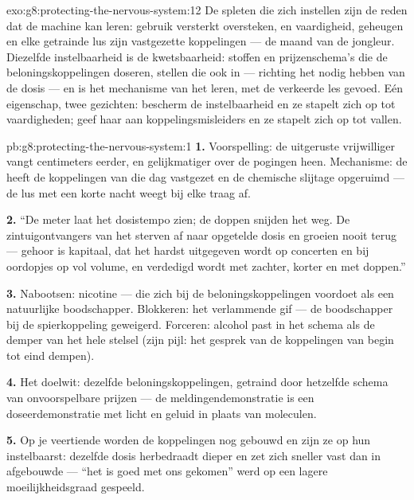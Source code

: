\begin{solution}{exo:g8:protecting-the-nervous-system:12}
De spleten die zich instellen zijn de reden dat de machine kan leren:
gebruik versterkt oversteken, en vaardigheid, geheugen en elke getrainde
lus zijn vastgezette koppelingen --- de maand van de jongleur. Diezelfde
instelbaarheid is de kwetsbaarheid: stoffen en prijzenschema's die de
beloningskoppelingen doseren, stellen die ook in --- richting het nodig
hebben van de dosis --- en  is het mechanisme van het leren, met
de verkeerde les gevoed. Eén eigenschap, twee gezichten: bescherm de
instelbaarheid en ze stapelt zich op tot vaardigheden; geef haar aan
koppelingsmisleiders en ze stapelt zich op tot vallen.
\end{solution}

\begin{solution}{pb:g8:protecting-the-nervous-system:1}
\textbf{1.} Voorspelling: de uitgeruste vrijwilliger vangt centimeters
eerder, en gelijkmatiger over de pogingen heen. Mechanisme: de  heeft
de koppelingen van die dag vastgezet en de chemische slijtage opgeruimd ---
de lus met een korte nacht weegt bij elke  traag af.

\textbf{2.} ``De meter laat het dosistempo zien; de doppen snijden het weg.
De zintuigontvangers van het  sterven af naar opgetelde dosis en groeien
nooit terug --- gehoor is kapitaal, dat het hardst uitgegeven wordt op
concerten en bij oordopjes op vol volume, en verdedigd wordt met zachter,
korter en met doppen.''

\textbf{3.} Nabootsen: nicotine --- die zich bij de beloningskoppelingen
voordoet als een natuurlijke boodschapper. Blokkeren: het verlammende gif
--- de boodschapper bij de spierkoppeling geweigerd. Forceren: alcohol
past in het schema als de demper van het hele stelsel (zijn pijl: het
gesprek van de koppelingen van begin tot eind dempen).

\textbf{4.} Het doelwit: dezelfde beloningskoppelingen, getraind door
hetzelfde schema van onvoorspelbare prijzen --- de meldingendemonstratie is
een doseerdemonstratie met licht en geluid in plaats van moleculen.

\textbf{5.} Op je veertiende worden de koppelingen nog gebouwd en zijn ze
op hun instelbaarst: dezelfde dosis herbedraadt dieper en zet zich sneller
vast dan in afgebouwde  --- ``het is goed met ons gekomen'' werd op een
lagere moeilijkheidsgraad gespeeld.


\end{solution}
